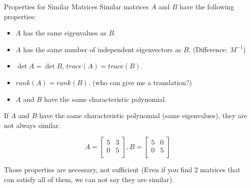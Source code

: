 \documentclass{beamer}
\begin{document}
\begin{frame}{Properties for Similar Matrices}
    Similar matrices $A$ and $B$ have the following properties:
    \begin{itemize}
        \item $A$ has the same eigenvalues as $B$.
        \item $A$ has the same number of independent eigenvectors as $B$. (Difference: $M^{-1}$)
        \item $\det A = \det B$, $trace (A) = trace (B)$.
        \item $rank (A) = rank (B)$. (who can give me a translation?)
        \item $A$ and $B$ have the same characteristic polynomial.
    \end{itemize}

    \vspace{3pt}
    If $A$ and $B$ have the same characteristic polynomial (same eigenvalues), they are not always similar.

    \begin{equation*}
        A=\left[ \begin{matrix}
            5&		3\\
            0&		5\\
        \end{matrix} \right] , B=\left[ \begin{matrix}
            5&		0\\
            0&		5\\
        \end{matrix} \right]
    \end{equation*}


    Those properties are necessary, not sufficient (Even if you find 2 matrices that can satisfy all of them, we can not say they are similar).
\end{frame}
\end{document}

